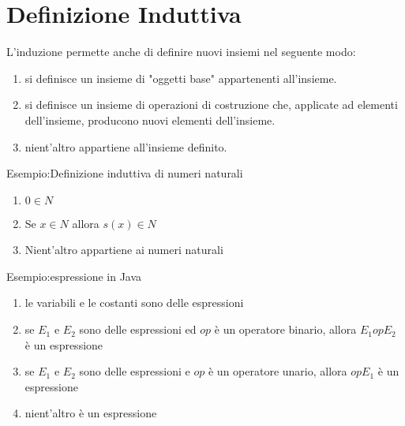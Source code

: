 \section{Definizione Induttiva}
L'induzione permette anche di definire nuovi insiemi nel seguente modo:
\begin{enumerate}
  \item si definisce un insieme di "oggetti base" appartenenti all'insieme.
  \item si definisce un insieme di operazioni di costruzione che, applicate ad elementi
        dell'insieme, producono nuovi elementi dell'insieme.
  \item nient'altro appartiene all'insieme definito.
\end{enumerate}

Esempio:Definizione induttiva di numeri naturali\newline
\begin{enumerate}
  \item $0 \in N$
  \item Se $x \in N$ allora $s(x) \in N$
  \item Nient'altro appartiene ai numeri naturali
\end{enumerate}

Esempio:espressione in Java
\begin{enumerate}
    \item le variabili e le costanti sono delle espressioni
    \item se $E_1$ e $E_2$ sono delle espressioni ed $op$ è un operatore binario,
          allora $E_1 op E_2$ è un espressione
    \item se $E_1$ e $E_2$ sono delle espressioni e $op$ è un operatore unario,
          allora $op E_1$ è un espressione
    \item nient'altro è un espressione
\end{enumerate}
